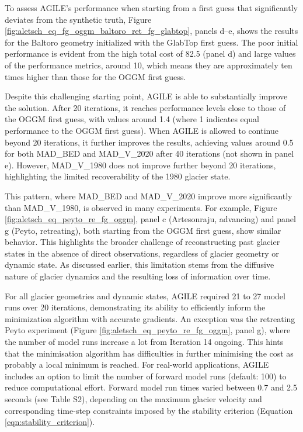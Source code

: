 \documentclass[journal abbreviation, manuscript]{copernicus}
\begin{document}
To assess AGILE’s performance when starting from a first guess that significantly deviates from the synthetic truth, Figure \ref{fig:aletsch_eq_fg_oggm_baltoro_ret_fg_glabtop}, panels d–e, shows the results for the Baltoro geometry initialized with the GlabTop first guess. The poor initial performance is evident from the high total cost of 82.5 (panel d) and large values of the performance metrics, around 10, which means they are approximately ten times higher than those for the OGGM first guess.

Despite this challenging starting point, AGILE is able to substantially improve the solution. After 20 iterations, it reaches performance levels close to those of the OGGM first guess, with values around 1.4 (where 1 indicates equal performance to the OGGM first guess). When AGILE is allowed to continue beyond 20 iterations, it further improves the results, achieving values around 0.5 for both MAD\_BED and MAD\_V\_2020 after 40 iterations (not shown in panel e). However, MAD\_V\_1980 does not improve further beyond 20 iterations, highlighting the limited recoverability of the 1980 glacier state.

This pattern, where MAD\_BED and MAD\_V\_2020 improve more significantly than MAD\_V\_1980, is observed in many experiments. For example, Figure \ref{fig:aletsch_eq_peyto_re_fg_oggm}, panel c (Artesonraju, advancing) and panel g (Peyto, retreating), both starting from the OGGM first guess, show similar behavior. This highlights the broader challenge of reconstructing past glacier states in the absence of direct observations, regardless of glacier geometry or dynamic state. As discussed earlier, this limitation stems from the diffusive nature of glacier dynamics and the resulting loss of information over time.

For all glacier geometries and dynamic states, AGILE required 21 to 27 model runs over 20 iterations, demonstrating its ability to efficiently inform the minimization algorithm with accurate gradients. An exception was the retreating Peyto experiment (Figure \ref{fig:aletsch_eq_peyto_re_fg_oggm}, panel g), where the number of model runs increase a lot from Iteration 14 ongoing. This hints that the minimisation algorithm has difficulties in further minimising the cost as probably a local minimum is reached. For real-world applications, AGILE includes an option to limit the number of forward model runs (default: 100) to reduce computational effort. Forward model run times varied between 0.7 and 2.5 seconds (see Table S2), depending on the maximum glacier velocity and corresponding time-step constraints imposed by the stability criterion (Equation \ref{eqn:stability_criterion}).
\end{document}
